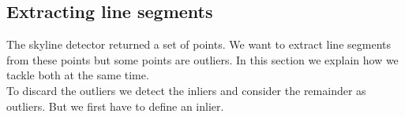 \documentclass[10pt]{article}
\begin{document}



\subsection{Extracting line segments}
	The skyline detector returned a set of points. We want to extract line
	segments from these points but some points are outliers. In this
	section we explain how we tackle both at the same time.\\
	To discard the outliers we detect the inliers and consider the remainder as outliers. But we first have to define an inlier.\\
\end{document}
